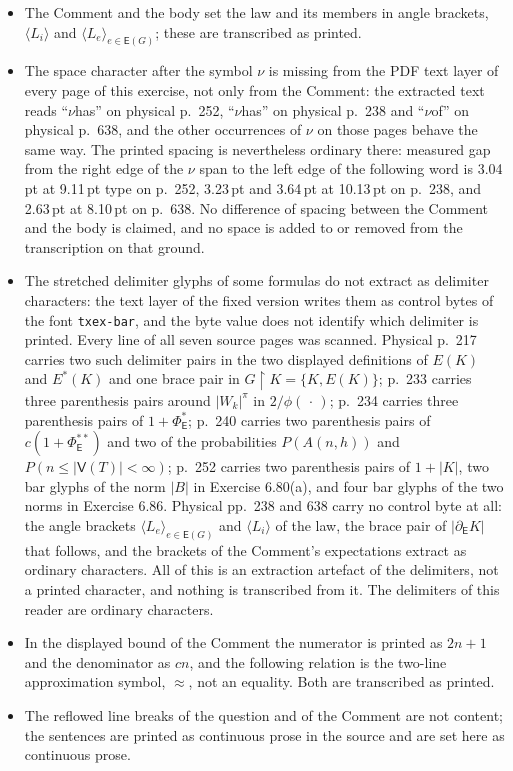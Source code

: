 \documentclass[11pt]{article}
\newcommand{\V}{\mathsf V}
\newcommand{\E}{\mathsf E}
\begin{document}
\begin{itemize}
\item The Comment and the body set the law and its members in angle brackets, $\langle L_{i}\rangle$ and $\langle L_{e}\rangle_{e\in\E(G)}$; these are transcribed as printed.
\item The space character after the symbol $\nu$ is missing from the PDF text layer of every page of this exercise, not only from the Comment: the extracted text reads ``$\nu$has'' on physical p.\ 252, ``$\nu$has'' on physical p.\ 238 and ``$\nu$of'' on physical p.\ 638, and the other occurrences of $\nu$ on those pages behave the same way. The printed spacing is nevertheless ordinary there: measured gap from the right edge of the $\nu$ span to the left edge of the following word is 3.04\,pt at 9.11\,pt type on p.\ 252, 3.23\,pt and 3.64\,pt at 10.13\,pt on p.\ 238, and 2.63\,pt at 8.10\,pt on p.\ 638. No difference of spacing between the Comment and the body is claimed, and no space is added to or removed from the transcription on that ground.
\item The stretched delimiter glyphs of some formulas do not extract as delimiter characters: the text layer of the fixed version writes them as control bytes of the font \texttt{txex-bar}, and the byte value does not identify which delimiter is printed. Every line of all seven source pages was scanned. Physical p.\ 217 carries two such delimiter pairs in the two displayed definitions of $E(K)$ and $E^{*}(K)$ and one brace pair in $G\!\restriction\!K=\{K,E(K)\}$; p.\ 233 carries three parenthesis pairs around $|W_{k}|^{\pi}$ in $2/\phi(\,\cdot\,)$; p.\ 234 carries three parenthesis pairs of $1+\Phi^{*}_{\E}$; p.\ 240 carries two parenthesis pairs of $c(1+\Phi^{**}_{\E})$ and two of the probabilities $P(A(n,h))$ and $P(n\le|\V(T)|<\infty)$; p.\ 252 carries two parenthesis pairs of $1+|K|$, two bar glyphs of the norm $|B|$ in Exercise 6.80(a), and four bar glyphs of the two norms in Exercise 6.86. Physical pp.\ 238 and 638 carry no control byte at all: the angle brackets $\langle L_{e}\rangle_{e\in\E(G)}$ and $\langle L_{i}\rangle$ of the law, the brace pair of $|\partial_{\E}K|$ that follows, and the brackets of the Comment's expectations extract as ordinary characters. All of this is an extraction artefact of the delimiters, not a printed character, and nothing is transcribed from it. The delimiters of this reader are ordinary characters.
\item In the displayed bound of the Comment the numerator is printed as $2n+1$ and the denominator as $cn$, and the following relation is the two-line approximation symbol, $\approx$, not an equality. Both are transcribed as printed.
\item The reflowed line breaks of the question and of the Comment are not content; the sentences are printed as continuous prose in the source and are set here as continuous prose.
\end{itemize}
\end{document}
